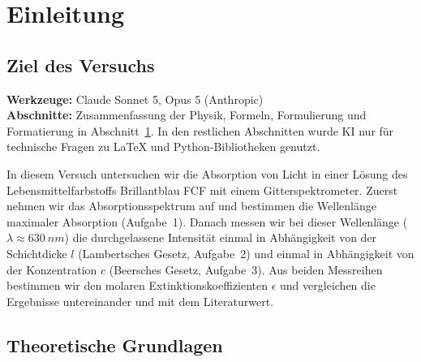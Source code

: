 \documentclass{article}
\let\OrigRef\ref
\renewcommand{\ref}[1]{{\color{linkblue}\uline{\OrigRef{#1}}}}
\begin{document}

\pagestyle{fancy}

\tableofcontents
\clearpage

\section{Einleitung}
\label{sec:einleitung}

\subsection{Ziel des Versuchs}
\label{sec:motivation}

\vspace{1em}
\begin{tcolorbox}[
	colback  = linkblue!3,
	colframe = linkblue!55,
	boxrule  = 0.4pt,
	arc      = 2pt,
	left     = 6pt, right = 6pt, top = 5pt, bottom = 5pt,
	fontupper = \small,
	title    = {\scriptsize\textsf{\textbf{Nutzung von Generativer künstlicher Intelligenz}}},
	coltitle = linkblue!80!black,
	colbacktitle = linkblue!10,
	fonttitle = \normalfont,
]
	\textbf{Werkzeuge:} Claude Sonnet 5, Opus 5 (Anthropic) \\
	\textbf{Abschnitte:} Zusammenfassung der Physik, Formeln, Formulierung und Formatierung in
	Abschnitt~\ref{sec:einleitung}.
	In den restlichen Abschnitten wurde KI nur für technische Fragen zu \LaTeX{} und
	Python-Bibliotheken genutzt.
\end{tcolorbox}

In diesem Versuch untersuchen wir die Absorption von Licht in einer Lösung des
Lebensmittelfarbstoffs Brillantblau FCF mit einem Gitterspektrometer. Zuerst nehmen wir das
Absorptionsspektrum auf und bestimmen die Wellenlänge maximaler Absorption (Aufgabe~1).
Danach messen wir bei dieser Wellenlänge ($\lambda \approx \qty{630}{nm}$) die durchgelassene
Intensität einmal in
Abhängigkeit von der Schichtdicke $l$ (Lambertsches Gesetz, Aufgabe~2) und einmal in
Abhängigkeit von der Konzentration $c$ (Beersches Gesetz, Aufgabe~3). Aus beiden
Messreihen bestimmen wir den molaren Extinktionskoeffizienten $\epsilon$ und vergleichen
die Ergebnisse untereinander und mit dem Literaturwert.


\subsection{Theoretische Grundlagen}
\label{sec:grundlagen}
\end{document}
